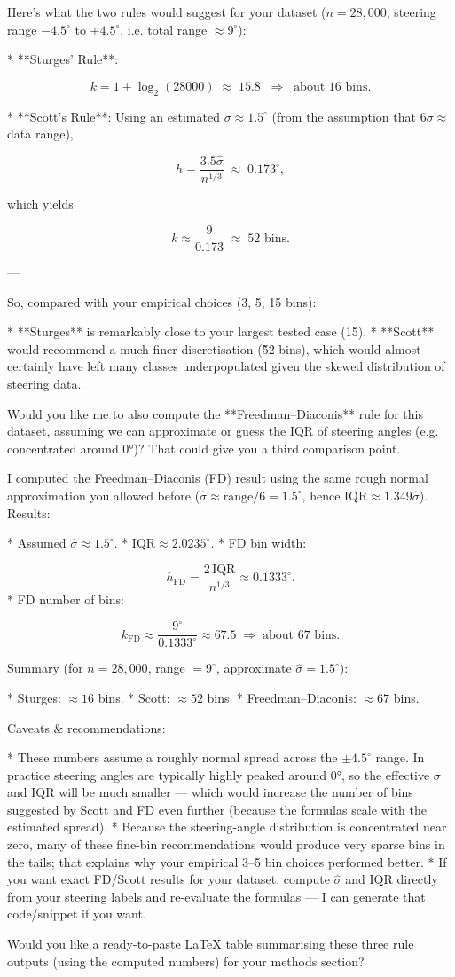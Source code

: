 Here’s what the two rules would suggest for your dataset ($n = 28{,}000$, steering range $-4.5^\circ$ to $+4.5^\circ$, i.e. total range $\approx 9^\circ$):

* **Sturges’ Rule**:

  $$
  k = 1 + \log_2(28000) \;\approx\; 15.8 \;\;\Rightarrow\;\; \text{about 16 bins.}
  $$

* **Scott’s Rule**:
  Using an estimated $\sigma \approx 1.5^\circ$ (from the assumption that $6\sigma \approx$ data range),

  $$
  h = \frac{3.5 \hat{\sigma}}{n^{1/3}} \;\approx\; 0.173^\circ,
  $$

  which yields

  $$
  k \approx \frac{9}{0.173} \;\approx\; 52 \text{ bins.}
  $$

---

So, compared with your empirical choices (3, 5, 15 bins):

* **Sturges** is remarkably close to your largest tested case (15).
* **Scott** would recommend a much finer discretisation (\~52 bins), which would almost certainly have left many classes underpopulated given the skewed distribution of steering data.

Would you like me to also compute the **Freedman–Diaconis** rule for this dataset, assuming we can approximate or guess the IQR of steering angles (e.g. concentrated around 0°)? That could give you a third comparison point.

I computed the Freedman–Diaconis (FD) result using the same rough normal approximation you allowed before ($\hat\sigma \approx \text{range}/6 = 1.5^\circ$, hence $\mathrm{IQR}\approx 1.349\hat\sigma$). Results:

* Assumed $\hat\sigma \approx 1.5^\circ$.
* $\mathrm{IQR}\approx 2.0235^\circ$.
* FD bin width:

  $$
  h_{\mathrm{FD}} = \frac{2\,\mathrm{IQR}}{n^{1/3}} \approx 0.1333^\circ.
  $$
* FD number of bins:

  $$
  k_{\mathrm{FD}} \approx \frac{9^\circ}{0.1333^\circ} \approx 67.5 \;\Rightarrow\; \text{about 67 bins.}
  $$

Summary (for $n=28{,}000$, range $=9^\circ$, approximate $\hat\sigma=1.5^\circ$):

* Sturges: $\approx 16$ bins.
* Scott: $\approx 52$ bins.
* Freedman–Diaconis: $\approx 67$ bins.

Caveats & recommendations:

* These numbers assume a roughly normal spread across the $\pm4.5^\circ$ range. In practice steering angles are typically highly peaked around 0°, so the effective $\sigma$ and IQR will be much smaller — which would increase the number of bins suggested by Scott and FD even further (because the formulas scale with the estimated spread).
* Because the steering-angle distribution is concentrated near zero, many of these fine-bin recommendations would produce very sparse bins in the tails; that explains why your empirical 3–5 bin choices performed better.
* If you want exact FD/Scott results for your dataset, compute $\hat\sigma$ and $\mathrm{IQR}$ directly from your steering labels and re-evaluate the formulas — I can generate that code/snippet if you want.

Would you like a ready-to-paste LaTeX table summarising these three rule outputs (using the computed numbers) for your methods section?


